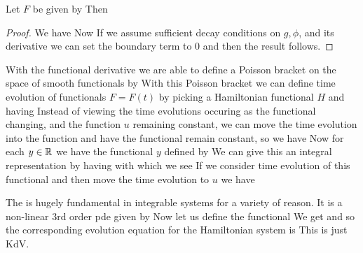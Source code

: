 \documentclass{article}
\begin{document}
\begin{prop}
	Let $F$ be given by 
Then 
\end{prop}
\begin{proof}
	We have
Now 
If we assume sufficient decay conditions on $g,\phi$, and its derivative we can set the boundary term to 0 and then the result follows. 
\end{proof}

With the functional derivative we are able to define a Poisson bracket on the space of smooth functionals by 
With this Poisson bracket we can define time evolution of functionals $F=F(t)$ by picking a Hamiltonian functional $H$ and having
Instead of viewing the time evolutions occuring as the functional changing, and the function $u$ remaining constant, we can move the time evolution into the function and have the functional remain constant, so we have 
Now for each $y \in \mathbb{R}$ we have the functional $y$ defined by 
We can give this an integral representation by having 
with which we see 
If we consider time evolution of this functional and then move the time evolution to $u$ we have 
\begin{example}
	The  is hugely fundamental in integrable systems for a variety of reason. It is a non-linear 3rd order pde given by 
Now let us define the functional 
We get 
and so the corresponding evolution equation for the Hamiltonian system is 
This is just KdV.
\end{example}
\end{document}
